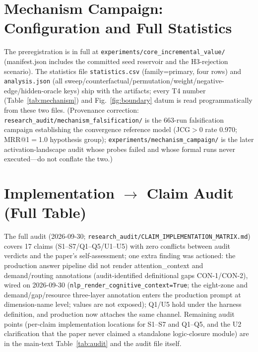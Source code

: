 \documentclass[10pt,a4paper]{article}
\begin{document}
\section{Mechanism Campaign: Configuration and Full Statistics}
\label{app:civ}
The preregistration is in full at \texttt{experiments/core\_incremental\_value/} (manifest.json includes the committed seed reservoir and the H3-rejection scenario). The statistics file \texttt{statistics.csv} (family=primary, four rows) and \texttt{analysis.json} (all sweep/counterfactual/permutation/weight/negative-edge/hidden-oracle keys) ship with the artifacts; every T4 number (Table~\ref{tab:mechanism}) and Fig.~\ref{fig:boundary} datum is read programmatically from these two files. (Provenance correction: \texttt{research\_audit/mechanism\_falsification/} is the 663-run falsification campaign establishing the convergence reference model (JCG$>$0 rate 0.970; MRR@1$=$1.0 hypothesis group); \texttt{experiments/mechanism\_campaign/} is the later activation-landscape audit whose probes failed and whose formal runs never executed---do not conflate the two.)

\section{Implementation $\rightarrow$ Claim Audit (Full Table)}
\label{app:audit}
The full audit (2026-09-30; \texttt{research\_audit/CLAIM\_IMPLEMENTATION\_MATRIX.md}) covers 17 claims (S1--S7/Q1--Q5/U1--U5) with zero conflicts between audit verdicts and the paper's self-assessment; one extra finding was actioned: the production answer pipeline did not render attention\_context and demand/routing annotations (audit-identified definitional gaps CON-1/CON-2), wired on 2026-09-30 (\texttt{nlp\_render\_cognitive\_context=True}; the eight-zone and demand/gap/resource three-layer annotation enters the production prompt at dimension-name level; values are not exposed); Q1/U5 hold under the harness definition, and production now attaches the same channel. Remaining audit points (per-claim implementation locations for S1--S7 and Q1--Q5, and the U2 clarification that the paper never claimed a standalone logic-closure module) are in the main-text Table~\ref{tab:audit} and the audit file itself.
\end{document}
